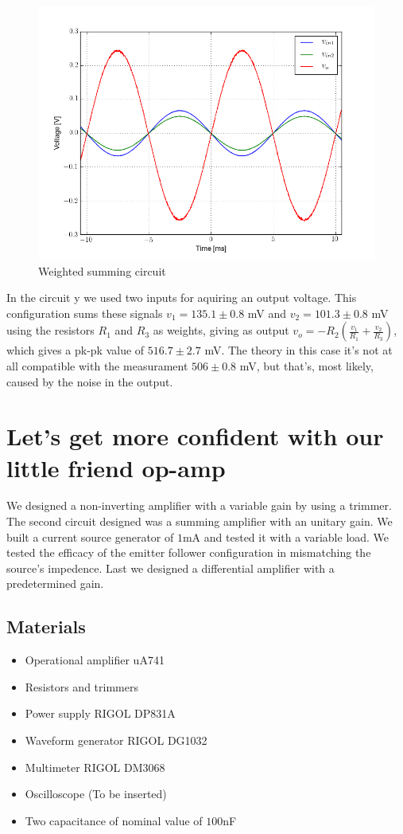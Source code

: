 \documentclass[oneside]{book}
\begin{document}
\begin{figure}[H]
\centering
\includegraphics[width=.7\textwidth]{img/scope5.png}
\caption{Weighted summing circuit}
\end{figure}
In the circuit y we used two inputs for aquiring an output voltage. This configuration sums these signals $v_1 = 135.1\pm 0.8$ mV and $v_2 = 101.3\pm 0.8$ mV using the resistors $R_1$ and $R_3$ as weights, giving as output $v_o = - R_2 (\frac{v_1}{R_1} + \frac{v_2}{R_3})$, which gives a pk-pk value of $516.7\pm 2.7$ mV. The theory in this case it's not at all compatible with the measurament $506\pm 0.8$ mV, but that's, most likely, caused by the noise in the output.
\chapter{Let's get more confident with our little friend op-amp}
We designed a non-inverting amplifier with a variable gain by using a trimmer. The second circuit designed was a summing amplifier with an unitary gain. We built a current source generator of $1$mA and tested it with a variable load. We tested the efficacy of the emitter follower configuration in mismatching the source's impedence. Last we designed a differential amplifier with a predetermined gain.
\section{Materials}
\begin{itemize}
\item Operational amplifier uA741
\item Resistors and trimmers
\item Power supply RIGOL DP831A
\item Waveform generator RIGOL DG1032
\item Multimeter RIGOL DM3068
\item Oscilloscope (To be inserted)
\item Two capacitance of nominal value of $100$nF
\end{itemize}
\end{document}

